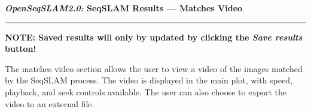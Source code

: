 \centerline{\textbf{\textit{OpenSeqSLAM2.0:} SeqSLAM Results --- Matches Video}}
\noindent\rule{\textwidth}{2pt}
\centerline{\textbf{NOTE: Saved results will only by updated by clicking the \textit{Save results} button!}}
\bigskip
\parbox{\textwidth}{The matches video section allows the user to view a video of the images matched by the SeqSLAM process. The video is displayed in the main plot, with speed, playback, and seek controls available. The user can also choose to export the video to an external file.}
\bigskip
